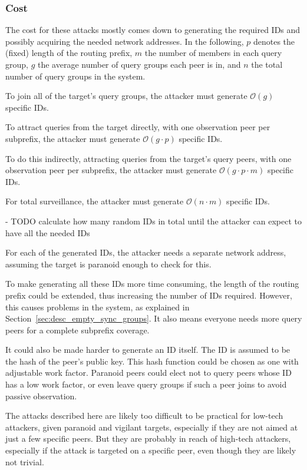 \subsubsection{Cost}
The cost for these attacks mostly comes down to generating the required IDs and
possibly acquiring the needed network addresses. In the following, $p$ denotes
the (fixed) length of the routing prefix, $m$ the number of members in each
query group, $g$ the average number of query groups each peer is in, and $n$ the
total number of query groups in the system.

To join all of the target's query groups, the attacker must generate
$\mathcal{O}(g)$ specific IDs.

To attract queries from the target directly, with one observation peer per
subprefix, the attacker must generate $\mathcal{O}(g \cdot p)$ specific IDs.

To do this indirectly, attracting queries from the target's query peers, with
one observation peer per subprefix, the attacker must generate $\mathcal{O}(g
\cdot p \cdot m)$ specific IDs.

For total surveillance, the attacker must generate $\mathcal{O}(n \cdot m)$
specific IDs.

- TODO calculate how many random IDs in total until the attacker can expect to
  have all the needed IDs

For each of the generated IDs, the attacker needs a separate network address,
assuming the target is paranoid enough to check for this.

To make generating all these IDs more time consuming, the length of the routing
prefix could be extended, thus increasing the number of IDs required. However,
this causes problems in the system, as explained in
Section~\ref{sec:desc_empty_sync_groups}. It also means everyone needs more
query peers for a complete subprefix coverage.

It could also be made harder to generate an ID itself. The ID is assumed to be
the hash of the peer's public key. This hash function could be chosen as one
with adjustable work factor. Paranoid peers could elect not to query peers whose
ID has a low work factor, or even leave query groups if such a peer joins to
avoid passive observation.

The attacks described here are likely too difficult to be practical for low-tech
attackers, given paranoid and vigilant targets, especially if they are not aimed
at just a few specific peers. But they are probably in reach of high-tech
attackers, especially if the attack is targeted on a specific peer, even though
they are likely not trivial.
